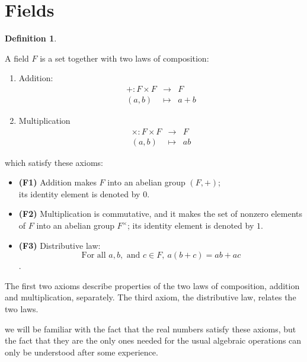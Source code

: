 \documentclass[
]{book}
\providecommand{\tightlist}{%
  \setlength{\itemsep}{0pt}\setlength{\parskip}{0pt}}
\theoremstyle{definition}
\newtheorem{definition}{Definition}[chapter]
\theoremstyle{definition}
\theoremstyle{definition}
\theoremstyle{definition}
\theoremstyle{remark}
\begin{document}
\hypertarget{fields}{%
\section{Fields}\label{fields}}

\begin{definition}
\protect\hypertarget{def:unnamed-chunk-79}{}\label{def:unnamed-chunk-79}

A field \(F\) is a set together with two laws of composition:

\begin{enumerate}
\def\labelenumi{\arabic{enumi}.}
\tightlist
\item
  Addition:
  \begin{eqnarray}
  +:F \times  F & \rightarrow & F \\
  (a,b) & \mapsto  & a+b
  \end{eqnarray}
\item
  Multiplication
  \begin{eqnarray}
  \times:F \times  F & \rightarrow & F \\
  (a,b) & \mapsto  & ab
  \end{eqnarray}
\end{enumerate}

which satisfy these axioms:

\begin{itemize}
\item
  \textbf{(F1)} Addition makes \(F\) into an abelian group \((F,+)\);\\
  its identity element is denoted by \(0\).
\item
  \textbf{(F2)} Multiplication is commutative, and it makes the set of nonzero elements of \(F\) into an abelian group \(F^{\times}\); its identity element is denoted by \(1\).
\item
  \textbf{(F3)} Distributive law:
  \[\text{For all } a, b,\text{ and } c \in F,~ a(b + c) = ab + ac\].
\end{itemize}

\end{definition}

The first two axioms describe properties of the two laws of composition, addition and multiplication, separately. The third axiom, the distributive law, relates the two laws.

we will be familiar with the fact that the real numbers satisfy these axioms, but the fact that they are the only ones needed for the usual algebraic operations can only be understood after some experience.
\end{document}
